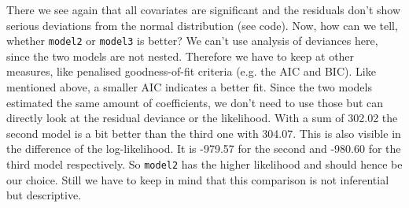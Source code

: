 There we see again that all covariates are significant and the residuals don't show serious deviations from the normal distribution (see code). Now, how can we tell, whether \texttt{model2} or \texttt{model3} is better? We can't use analysis of deviances here, since the two models are not nested. Therefore we have to keep at other measures, like penalised goodness-of-fit criteria (e.g. the AIC and BIC). Like mentioned above, a smaller AIC indicates a better fit. Since the two models estimated the same amount of coefficients, we don't need to use those but can directly look at the residual deviance or the likelihood. With a sum of 302.02 the second model is a bit better than the third one with 304.07. This is also visible in the difference of the log-likelihood. It is -979.57 for the second and -980.60 for the third model respectively. So \texttt{model2} has the higher likelihood and should hence be our choice. Still we have to keep in mind that this comparison is not inferential but descriptive. 